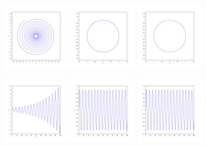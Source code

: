\documentclass[11pt]{article}
\begin{document}
\begin{figure}[H]
\centering
\includegraphics[width=0.3\textwidth]{images/soal_01_ode_euler_y1_y2.pdf}
\includegraphics[width=0.3\textwidth]{images/soal_01_ode_euler_PC_y1_y2.pdf}
\includegraphics[width=0.3\textwidth]{images/soal_01_ode_RK4_y1_y2.pdf}
\par
\end{figure}

\begin{figure}[H]
\centering
\includegraphics[width=0.3\textwidth]{images/soal_01_ode_euler_t_y1.pdf}
\includegraphics[width=0.3\textwidth]{images/soal_01_ode_euler_PC_t_y1.pdf}
\includegraphics[width=0.3\textwidth]{images/soal_01_ode_RK4_t_y1.pdf}
\par
\end{figure}
\end{document}
